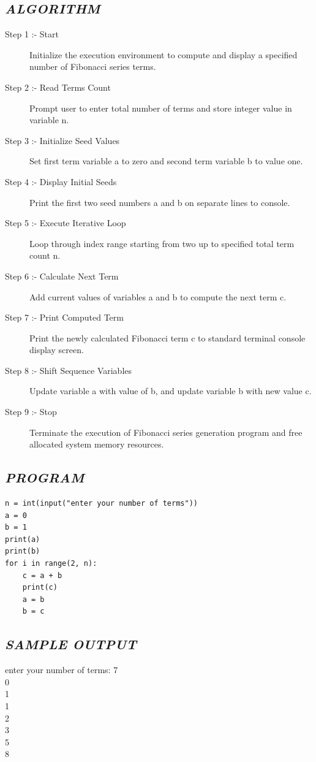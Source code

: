 \documentclass[11pt,a4paper]{article}
\begin{document}
\subsection*{\textit{ALGORITHM}}
\begin{description}
  \item[Step 1 :- Start] Initialize the execution environment to compute and display a specified number of Fibonacci series terms.
  \item[Step 2 :- Read Terms Count] Prompt user to enter total number of terms and store integer value in variable n.
  \item[Step 3 :- Initialize Seed Values] Set first term variable a to zero and second term variable b to value one.
  \item[Step 4 :- Display Initial Seeds] Print the first two seed numbers a and b on separate lines to console.
  \item[Step 5 :- Execute Iterative Loop] Loop through index range starting from two up to specified total term count n.
  \item[Step 6 :- Calculate Next Term] Add current values of variables a and b to compute the next term c.
  \item[Step 7 :- Print Computed Term] Print the newly calculated Fibonacci term c to standard terminal console display screen.
  \item[Step 8 :- Shift Sequence Variables] Update variable a with value of b, and update variable b with new value c.
  \item[Step 9 :- Stop] Terminate the execution of Fibonacci series generation program and free allocated system memory resources.
\end{description}

\subsection*{\textit{PROGRAM}}
\begin{lstlisting}[style=pythonstyle]
n = int(input("enter your number of terms")) 
a = 0 
b = 1 
print(a) 
print(b) 
for i in range(2, n): 
    c = a + b 
    print(c)  
    a = b 
    b = c
\end{lstlisting}

\subsection*{\textit{SAMPLE OUTPUT}}
\begin{tcolorbox}[colback=black!85,colframe=navyblue,title=\textbf{Terminal Output},coltitle=white,fonttitle=\bfseries\small]
\small\ttfamily\color{green!30!white}
enter your number of terms: 7\\
0\\
1\\
1\\
2\\
3\\
5\\
8
\end{tcolorbox}
\end{document}
